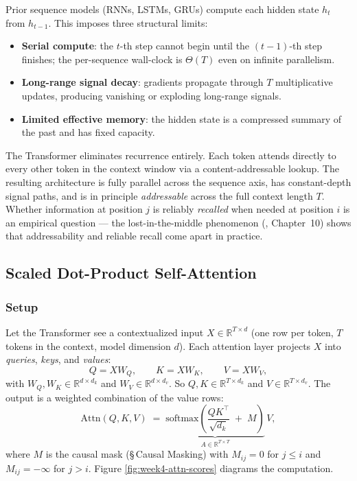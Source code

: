 Prior sequence models (RNNs, LSTMs, GRUs) compute each hidden state
$h_t$ from $h_{t-1}$. This imposes three structural limits:
\begin{itemize}
  \item \textbf{Serial compute}: the $t$-th step cannot begin until the
        $(t-1)$-th step finishes; the per-sequence wall-clock is
        $\Theta(T)$ even on infinite parallelism.
  \item \textbf{Long-range signal decay}: gradients propagate through
        $T$ multiplicative updates, producing vanishing or exploding
        long-range signals.
  \item \textbf{Limited effective memory}: the hidden state is a
        compressed summary of the past and has fixed capacity.
\end{itemize}
The Transformer \citep{vaswani2017attention} eliminates recurrence
entirely. Each token attends directly to every other token in the
context window via a content-addressable lookup. The resulting
architecture is fully parallel across the sequence axis, has
constant-depth signal paths, and is in principle \emph{addressable}
across the full context length $T$. Whether information at position
$j$ is reliably \emph{recalled} when needed at position $i$ is an
empirical question --- the lost-in-the-middle phenomenon
(\citealt{liu2024lost}, Chapter~10) shows that addressability and
reliable recall come apart in practice.

\subsection{Scaled Dot-Product Self-Attention}

\subsubsection{Setup}

Let the Transformer see a contextualized input
$X \in \mathbb{R}^{T\times d}$ (one row per token, $T$ tokens in the
context, model dimension $d$). Each attention layer projects $X$ into
\emph{queries}, \emph{keys}, and \emph{values}:
\begin{equation}
\label{eq:week4-qkv}
Q = X W_Q, \qquad
K = X W_K, \qquad
V = X W_V,
\end{equation}
with $W_Q, W_K \in \mathbb{R}^{d \times d_k}$ and
$W_V \in \mathbb{R}^{d \times d_v}$. So $Q, K \in \mathbb{R}^{T\times d_k}$
and $V \in \mathbb{R}^{T\times d_v}$. The output is a weighted
combination of the value rows:
\begin{equation}
\label{eq:week4-attn}
\mathrm{Attn}(Q, K, V)
  \;=\; \underbrace{\mathrm{softmax}\!\left(\frac{Q K^{\top}}{\sqrt{d_k}} \;+\; M\right)}_{A \in \mathbb{R}^{T\times T}}\,
        V,
\end{equation}
where $M$ is the causal mask (\S\,Causal Masking) with $M_{ij} = 0$
for $j \le i$ and $M_{ij} = -\infty$ for $j > i$. Figure
\ref{fig:week4-attn-scores} diagrams the computation.

